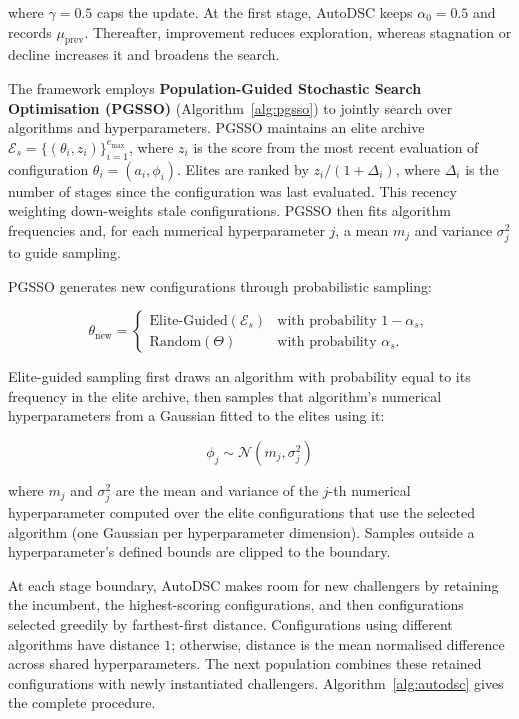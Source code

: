\documentclass[conference]{IEEEtran}
\begin{document}
where $\gamma=0.5$ caps the update. At the first stage, AutoDSC keeps $\alpha_0=0.5$ and records $\mu_{\text{prev}}$. Thereafter, improvement reduces exploration, whereas stagnation or decline increases it and broadens the search.

The framework employs \textbf{Population-Guided Stochastic Search Optimisation (PGSSO)} (Algorithm~\ref{alg:pgsso}) to jointly search over algorithms and hyperparameters. PGSSO maintains an elite archive $\mathcal{E}_s=\{(\theta_i,z_i)\}_{i=1}^{e_{\max}}$, where $z_i$ is the score from the most recent evaluation of configuration $\theta_i=(a_i,\phi_i)$. Elites are ranked by $z_i/(1+\Delta_i)$, where $\Delta_i$ is the number of stages since the configuration was last evaluated. This recency weighting down-weights stale configurations. PGSSO then fits algorithm frequencies and, for each numerical hyperparameter $j$, a mean $m_j$ and variance $\sigma_j^2$ to guide sampling.

PGSSO generates new configurations through probabilistic sampling:

\begin{equation}
\theta_{\text{new}} = \begin{cases}
\text{Elite-Guided}(\mathcal{E}_s) & \text{with probability } 1-\alpha_s, \\
\text{Random}(\Theta) & \text{with probability } \alpha_s.
\end{cases}
\end{equation}

Elite-guided sampling first draws an algorithm with probability equal to its frequency in the elite archive, then samples that algorithm's numerical hyperparameters from a Gaussian fitted to the elites using it:

\begin{equation}
\phi_j \sim \mathcal{N}(m_j, \sigma_j^2)
\end{equation}

where $m_j$ and $\sigma_j^2$ are the mean and variance of the $j$-th numerical hyperparameter computed over the elite configurations that use the selected algorithm (one Gaussian per hyperparameter dimension). Samples outside a hyperparameter's defined bounds are clipped to the boundary.

At each stage boundary, AutoDSC makes room for new challengers by retaining the incumbent, the highest-scoring configurations, and then configurations selected greedily by farthest-first distance. Configurations using different algorithms have distance $1$; otherwise, distance is the mean normalised difference across shared hyperparameters. The next population combines these retained configurations with newly instantiated challengers. Algorithm~\ref{alg:autodsc} gives the complete procedure.
\end{document}
